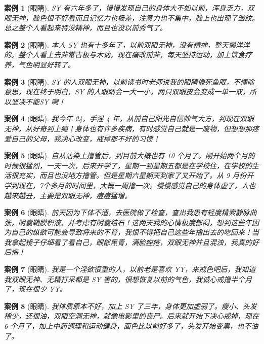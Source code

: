 \documentclass{ctexart}
\newtheorem{case}{案例}
\begin{document}
\begin{case}[眼睛]
    SY 有六年多了，慢慢发现自己的身体大不如以前，浑身乏力，双眼无神，脸色很不好看而且记忆力也极差，注意力也不集中，脸上也出现了皱纹。总之整个人看起来特没精神，而且也没以前秀气了。
\end{case}

\begin{case}[眼睛]
    本人 SY 也有十多年了，以前双眼无神，没有精神，整天懒洋洋的。整个人看上去非常古板与木讷。现在痛改前非，每天坚持运动，加上饮食疗养，气色明显好转了。
\end{case}

\begin{case}[眼睛]
    SY 的人双眼无神，以前读书时老师说我的眼睛像死鱼眼，不懂啥意思，现在终于明白，SY 的人眼睛会一大一小，两只双眼皮会变成一单一双，所以坚决不能SY 啊！
\end{case}

\begin{case}[眼睛]
    我今年 24，手淫 4 年，从前自己阳光自信帅气大方，到现在双眼无神，从好奇到上瘾！身体也有许多疾病，有时感觉自己就是一废物，但想想那疼爱自己的父母，我决心改变，戒掉那不好的习惯！
\end{case}

\begin{case}[眼睛]
    自从沾染上撸管后，到目前大概也有 10 个月了。刚开始两个月的时候很猛烈，一天一次，后来开学了，星期一到星期五都是在学校住，在学校的生活很充实，而且也没地方撸管。但是星期六星期天到家了又开始了。从 9 月份开学到现在，7个多月的时间里，大概一周撸一次。慢慢感觉自己的身体虚了，人也越来越丑，主要是双眼无神，痘痘猛增。
\end{case}

\begin{case}[眼睛]
    前天因为下体不适，去医院做了检查，查出我患有轻度精索静脉曲张，阴囊鞘膜积液，并考虑有阴囊结石！这两天我的心情极度郁闷，想到这些年因为自己的纵欲可能会导致将来的不育，我恨不得把自己这些年撸出去的吃回来！当我拿起镜子仔细看了看自己，眼部黑青，满脸痤疮，双眼无神并且混浊，我真的好后悔！
\end{case}

\begin{case}[眼睛]
    我是一个淫欲很重的人，以前老是喜欢 YY，来戒色吧后，我知道我双眼无神、无精打采都是 SY 害的，很想恢复以前的气色，我诚心戒撸半个月了，现在很少 YY。
\end{case}

\begin{case}[眼睛]
    我体质原本不好，加上 SY 了三年，身体更加虚弱了。瘦小、头发稀少，还很油，双眼空洞无神，就像电影里的丧尸。后来就开始下决心戒掉，现在 6 个月了，加上中药调理和运动健身，面色比以前好多了，头发开始变黑，也不油了。
\end{case}
\end{document}
